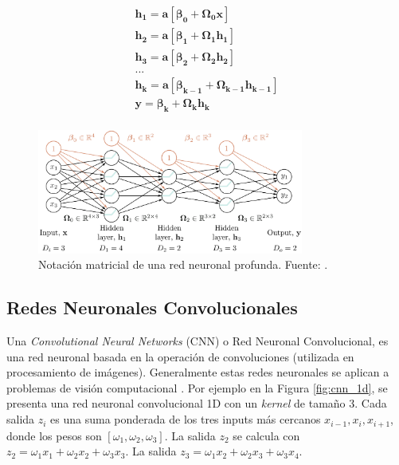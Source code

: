 \begin{equation}\label{equa:dl_1}
	\begin{split}
		\mathbf{h_1 = a [ \beta_{0} + \Omega_{0}x  ]}	 \\
		\mathbf{h_2 = a [ \beta_{1} + \Omega_{1} h_1  ]}	 \\
		\mathbf{h_3 = a [ \beta_{2} + \Omega_{2} h_2  ]}	 \\
		... \\
		\mathbf{h_k = a [ \beta_{k-1} + \Omega_{k-1} h_{k-1}  ]}	 \\
		\mathbf{y = \beta_{k} + \Omega_{k} h_{k} }	 \\
	\end{split}
\end{equation}

\begin{figure}[]
	\centering
	\includegraphics[width=0.78\textwidth]{../img/theory/deep_nn}
	\caption{Notación matricial de una red neuronal profunda. Fuente: \cite{prince2023understanding}.}
	\label{fig:deep_nn}
\end{figure}


\subsection{Redes Neuronales Convolucionales}

Una \textit{Convolutional Neural Networks} (CNN) o Red Neuronal Convolucional, es una red neuronal basada en la operación de convoluciones (utilizada en procesamiento de imágenes). Generalmente estas redes neuronales se aplican a problemas de visión computacional \citep{zhang2021dive}. Por ejemplo en la Figura \ref{fig:cnn_1d}, se presenta una red neuronal convolucional 1D con un \textit{kernel} de tamaño 3.  Cada salida $z_i$ es una suma ponderada de los tres inputs más cercanos $x_{i-1}, x_{i}, x_{i+1}$, donde los pesos son $[\omega_1, \omega_2, \omega_3]$. La salida $z_2$ se calcula con $z_2 = \omega_1x_1 + \omega_2x_2 + \omega_3x_3$. La salida $z_3 = \omega_1x_2 + \omega_2x_3 + \omega_3x_4$. 

